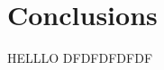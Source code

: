 \documentclass{acm_proc_article-sp}
\begin{document}
\section{Conclusions}


HELLLO DFDFDFDFDF~\cite{Chothia10}


%
%

\balancecolumns
\end{document}
